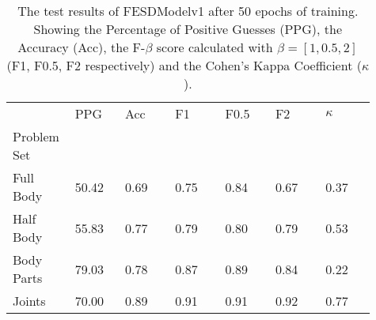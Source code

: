   \begin{table}[!htbp]
      \caption[Test Results of FESDModelv1]{The test results of FESDModelv1 after 50 epochs of training. Showing the Percentage of Positive Guesses (PPG), the Accuracy (Acc), the F-$\beta$ score calculated with $\beta = [1, 0.5, 2]$ (F1, F0.5, F2 respectively) and the Cohen's Kappa Coefficient ($\kappa$).}
      \label{tab:res_v1}
      \begin{tabular}{p{0.13\linewidth}p{0.13\linewidth}p{0.13\linewidth}p{0.13\linewidth}p{0.13\linewidth}p{0.13\linewidth}p{0.13\linewidth}}
\hline
{} &   PPG &  Acc &   F1 &  F0.5 &   F2 &  $\kappa$ \\
Problem Set   &       &      &      &       &      &           \\
\hline
Full Body  & 50.42 & 0.69 & 0.75 &  0.84 & 0.67 &      0.37 \\
Half Body  & 55.83 & 0.77 & 0.79 &  0.80 & 0.79 &      0.53 \\
Body Parts & 79.03 & 0.78 & 0.87 &  0.89 & 0.84 &      0.22 \\
Joints     & 70.00 & 0.89 & 0.91 &  0.91 & 0.92 &      0.77 \\
\hline
\end{tabular}

  \end{table}
